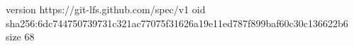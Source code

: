 version https://git-lfs.github.com/spec/v1
oid sha256:6dc744750739731c321ac77075f31626a19e11ed787f899baf60c30c136622b6
size 68
